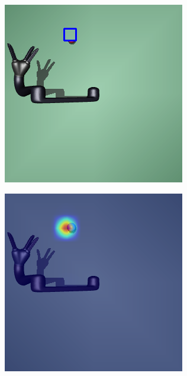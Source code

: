 \begin{figure}[h!]
\begin{subfigure}{0.24\columnwidth}
  \end{subfigure}
  \begin{subfigure}{0.24\columnwidth}
    \includegraphics[width=\linewidth]{figures/chapter6/average_map_mask.png}
  \end{subfigure}
  \begin{subfigure}{0.24\columnwidth}
    \includegraphics[width=\linewidth]{figures/chapter6/occ_jaco_average_map.png}

\end{subfigure}
\end{figure}
